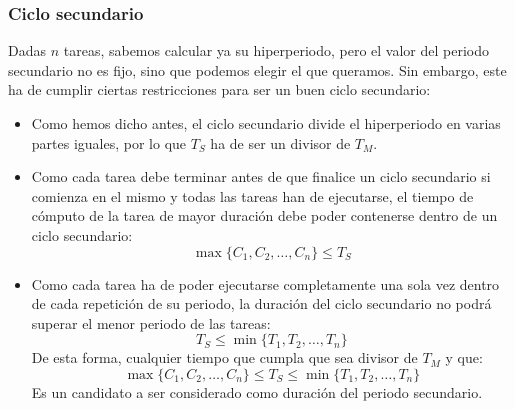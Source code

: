 \subsubsection{Ciclo secundario}
Dadas $n$ tareas, sabemos calcular ya su hiperperiodo, pero el valor del periodo secundario no es fijo, sino que podemos elegir el que queramos. Sin embargo, este ha de cumplir ciertas restricciones para ser un buen ciclo secundario:
\begin{itemize}
    \item Como hemos dicho antes, el ciclo secundario divide el hiperperiodo en varias partes iguales, por lo que $T_S$ ha de ser un divisor de $T_M$.
    \item Como cada tarea debe terminar antes de que finalice un ciclo secundario si comienza en el mismo y todas las tareas han de ejecutarse, el tiempo de cómputo de la tarea de mayor duración debe poder contenerse dentro de un ciclo secundario:
        \begin{equation*}
            \max\{C_1,C_2,\ldots,C_n\} \leq T_S
        \end{equation*}
    \item Como cada tarea ha de poder ejecutarse completamente una sola vez dentro de cada repetición de su periodo, la duración del ciclo secundario no podrá superar el menor periodo de las tareas:
        \begin{equation*}
            T_S \leq \min\{T_1,T_2,\ldots,T_n\}
        \end{equation*}
        De esta forma, cualquier tiempo que cumpla que sea divisor de $T_M$ y que:
        \begin{equation*}
            \max\{C_1,C_2,\ldots,C_n\} \leq T_S \leq \min\{T_1,T_2,\ldots,T_n\}
        \end{equation*}
        Es un candidato a ser considerado como duración del periodo secundario.
\end{itemize}

